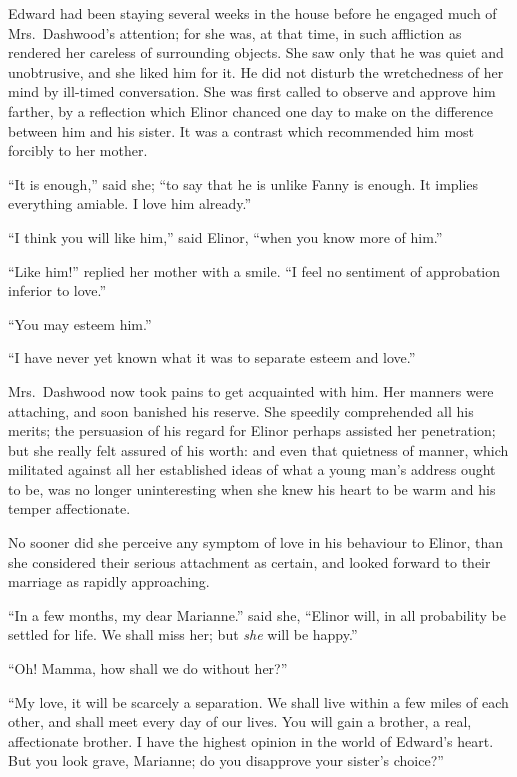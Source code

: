 Edward had been staying several weeks in the house
before he engaged much of Mrs.\ Dashwood's attention;
for she was, at that time, in such affliction as rendered
her careless of surrounding objects.  She saw only that he
was quiet and unobtrusive, and she liked him for it.
He did not disturb the wretchedness of her mind by
ill-timed conversation.  She was first called to observe
and approve him farther, by a reflection which Elinor
chanced one day to make on the difference between him
and his sister.  It was a contrast which recommended him
most forcibly to her mother.

``It is enough,'' said she; ``to say that he is unlike
Fanny is enough.  It implies everything amiable.
I love him already.''

``I think you will like him,'' said Elinor, ``when you
know more of him.''

``Like him!'' replied her mother with a smile.
``I feel no sentiment of approbation inferior to love.''

``You may esteem him.''

``I have never yet known what it was to separate
esteem and love.''

Mrs.\ Dashwood now took pains to get acquainted with him.
Her manners were attaching, and soon banished his reserve.
She speedily comprehended all his merits; the persuasion
of his regard for Elinor perhaps assisted her penetration;
but she really felt assured of his worth: and even that
quietness of manner, which militated against all her
established ideas of what a young man's address ought to be,
was no longer uninteresting when she knew his heart to be
warm and his temper affectionate.

No sooner did she perceive any symptom of love
in his behaviour to Elinor, than she considered their
serious attachment as certain, and looked forward
to their marriage as rapidly approaching.

``In a few months, my dear Marianne.'' said she,
``Elinor will, in all probability be settled for life.
We shall miss her; but \emph{she} will be happy.''

``Oh! Mamma, how shall we do without her?''

``My love, it will be scarcely a separation.
We shall live within a few miles of each other, and shall
meet every day of our lives.  You will gain a brother,
a real, affectionate brother.  I have the highest opinion
in the world of Edward's heart.  But you look grave,
Marianne; do you disapprove your sister's choice?''

